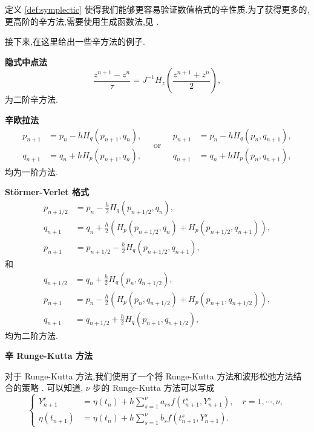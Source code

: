 \begin{remark}
{\rm 定义 \ref{def:symplectic} 使得我们能够更容易验证数值格式的辛性质.为了获得更多的,更高阶的辛方法,需要使用生成函数法,见 \cite{hairer2006geometric}.}
\end{remark}

接下来,在这里给出一些辛方法的例子.

\noindent \textbf{隐式中点法}
\begin{equation*}
\frac{z^{n+1}-z^n}{\tau}=J^{-1}H_z(\frac{z^{n+1}+z^n}{2}),
\end{equation*}
为二阶辛方法.

\noindent \textbf{辛欧拉法}
\begin{equation*}
\begin{aligned}
p_{n+1}&=p_n-hH_q(p_{n+1},q_n),\\
q_{n+1}&=q_n+hH_p(p_{n+1},q_n),
\end{aligned}
\quad \text{or} \quad
\begin{aligned}
p_{n+1}&=p_n-hH_q(p_n,q_{n+1}),\\
q_{n+1}&=q_n+hH_p(p_n,q_{n+1}),
\end{aligned}
\end{equation*}
均为一阶方法.

\noindent \textbf{St\"{o}rmer-Verlet 格式}
\begin{equation*}
\begin{aligned}
p_{n+1/2}&=p_n-\frac{h}{2}H_q(p_{n+1/2},q_n),\\
q_{n+1}&=q_n+\frac{h}{2}(H_p(p_{n+1/2},q_n)+H_p(p_{n+1/2},q_{n+1})),\\
p_{n+1}&=p_{n+1/2}-\frac{h}{2}H_q(p_{n+1/2},q_{n+1}),
\end{aligned}
\end{equation*}
和
\begin{equation*}
\begin{aligned}
q_{n+1/2}&=q_n+\frac{h}{2}H_q(p_n,q_{n+1/2}),\\
p_{n+1}&=p_n-\frac{h}{2}(H_p(p_n,q_{n+1/2})+H_p(p_{n+1},q_{n+1/2})),\\
q_{n+1}&=q_{n+1/2}+\frac{h}{2}H_q(p_{n+1},q_{n+1/2}),
\end{aligned}
\end{equation*}
均为二阶方法.

\noindent \textbf{辛 Runge-Kutta 方法}

对于 Runge-Kutta 方法,我们使用了一个将 Runge-Kutta 方法和波形松弛方法结合的策略 \cite{bellen1993use,bellen1994contractivity}. 可以知道, $\nu$ 步的 Runge-Kutta 方法可以写成
\begin{equation*}
  \left\lbrace
    \begin{aligned}
      Y_{n+1}^{r}&=\eta(t_{n})+h\sum_{s=1}^{\nu}a_{rs}f(t_{n+1}^{s},Y_{n+1}^{s}),\quad r=1,\cdots, \nu, \\
      \eta(t_{n+1})&=\eta(t_{n})+h\sum_{s=1}^{\nu}b_{s}f(t_{n+1}^{s},Y_{n+1}^{s}).
    \end{aligned}
  \right.
\end{equation*}

